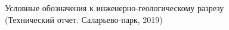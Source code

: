 \begin{figure}[ht!]
  \caption{Условные обозначения к инженерно-геологическому разрезу (Технический отчет. Саларьево-парк, 2019)}\label{fig:fig}
\end{figure}

%    


